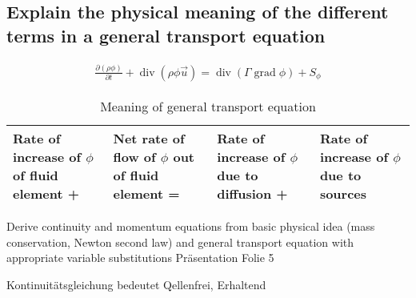 \documentclass[a4paper]{scrartcl}
\begin{document}
\subsection{Explain the physical meaning of the different terms in a general
transport equation}

\begin{align}
\frac{\partial(\rho \phi)}{\partial t} + \operatorname{div}(\rho\phi\vec
u)=\operatorname{div}(\Gamma \operatorname{grad} \phi) + S_\phi
\end{align}

\begin{table}[h]
\begin{center}
\begin{tabular}{|p{2.5cm}|p{2.5cm}|p{2.5cm}|p{2.5cm}|}
\hline Rate of increase of $\phi$ of fluid element +& Net rate of flow of $\phi$
out of fluid element =& Rate of increase of $\phi$ due to diffusion +& Rate of
increase of $\phi$ due to sources \\
\hline
\end{tabular}
\caption{Meaning of general transport equation}
\end{center}
\end{table}

Derive continuity and momentum equations from basic physical idea (mass conservation, Newton second law) and general transport equation with appropriate variable substitutions
Präsentation Folie 5

Kontinuitätsgleichung bedeutet Qellenfrei, Erhaltend
\end{document}
